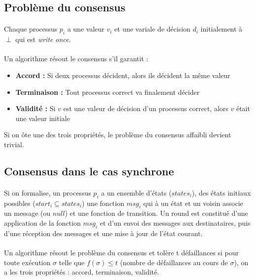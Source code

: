 \documentclass[french]{article}
\begin{document}
\subsection{Problème du consensus}

\paragraph{}Chaque processus $p_i$ a une valeur $v_i$ et une variale de décision $d_i$ initialement à $\perp$ qui est \emph{write once}.

\paragraph{}Un algorithme résout le consensus s'il garantit :
\begin{itemize}
	\item \textbf{Accord :} Si deux processus décident, alors ils décident la même valeur
	\item \textbf{Terminaison :} Tout processus correct va finalement décider
	\item \textbf{Validité :} Si $v$ est une valeur de décision d'un processus correct, alors $v$ était une valeur initiale
\end{itemize}

Si on ôte une des trois propriétés, le problème du consensus affaibli devient trivial.

\subsection{Consensus dans le cas synchrone}

\paragraph{}Si on formalise, un processus $p_i$ a un ensemble d'états ($states_i$), des états initiaux possibles ($start_i \subseteq states_i$) une fonction $msg_i$ qui à un état et un voisin associe un message (ou $null$) et une fonction de transition.
Un round est constitué d'une application de la fonction $msg_i$ et d'un envoi des messages aux destinataires, puis d'une réception des messages et une mise à jour de l'état courant.

\paragraph{}Un algorithme résout le problème du consensus et tolère t défaillances si pour toute exécution $\sigma$ telle que $f(\sigma) \leq t$ (nombre de défaillances au cours de $\sigma$), on a les trois propriétés : accord, terminaison, validité.
\end{document}
